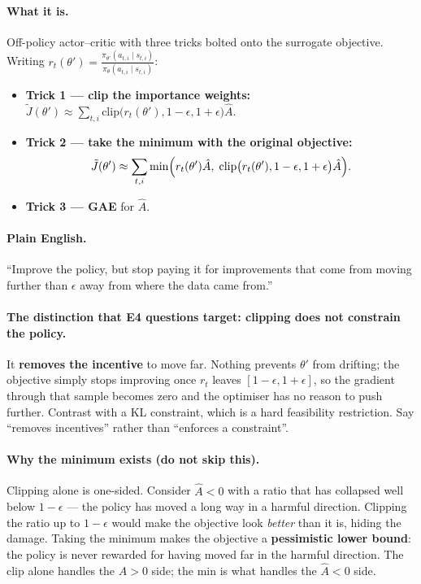 \documentclass[11pt,a4paper]{article}
\begin{document}
\paragraph{What it is.} Off-policy actor--critic with three tricks bolted onto
the surrogate objective. Writing $r_t(\theta')=\frac{\pi_{\theta'}(a_{t,i}\mid s_{t,i})}{\pi_\theta(a_{t,i}\mid s_{t,i})}$:
\begin{itemize}
\item \textbf{Trick 1 --- clip the importance weights:}
$\tilde J(\theta')\approx\sum_{t,i}\mathrm{clip}\bigl(r_t(\theta'),1-\epsilon,1+\epsilon\bigr)\hat A$.
\item \textbf{Trick 2 --- take the minimum with the original objective:}
\[
\tilde J(\theta')\approx\sum_{t,i}\min\Bigl(r_t(\theta')\hat A,\;
\mathrm{clip}\bigl(r_t(\theta'),1-\epsilon,1+\epsilon\bigr)\hat A\Bigr).
\]
\item \textbf{Trick 3 --- GAE} for $\hat A$.
\end{itemize}

\paragraph{Plain English.} ``Improve the policy, but stop paying it for
improvements that come from moving further than $\epsilon$ away from where the
data came from.''

\paragraph{The distinction that E4 questions target: clipping does not
constrain the policy.} It \textbf{removes the incentive} to move far. Nothing
prevents $\theta'$ from drifting; the objective simply stops improving once
$r_t$ leaves $[1-\epsilon,1+\epsilon]$, so the gradient through that sample
becomes zero and the optimiser has no reason to push further. Contrast with a
KL constraint, which is a hard feasibility restriction. Say ``removes
incentives'' rather than ``enforces a constraint''.

\paragraph{Why the minimum exists (do not skip this).} Clipping alone is
one-sided. Consider $\hat A<0$ with a ratio that has collapsed well below
$1-\epsilon$ --- the policy has moved a long way in a harmful direction.
Clipping the ratio up to $1-\epsilon$ would make the objective look
\emph{better} than it is, hiding the damage. Taking the minimum makes the
objective a \textbf{pessimistic lower bound}: the policy is never rewarded for
having moved far in the harmful direction. The clip alone handles the
$\hat A>0$ side; the min is what handles the $\hat A<0$ side.
\end{document}
